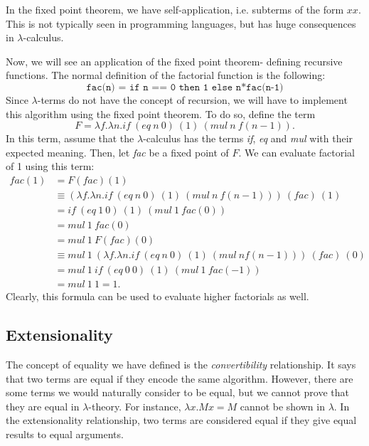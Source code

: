 \documentclass[a4paper, openany]{memoir}
\theoremstyle{definition}
\begin{document}
    In the fixed point theorem, we have self-application, i.e. subterms of the form $xx$. This is not typically seen in programming languages, but has huge consequences in $\lambda$-calculus.

    Now, we will see an application of the fixed point theorem- defining recursive functions. The normal definition of the factorial function is the following:
    \[\texttt{fac(n) = if n == 0 then 1 else n*fac(n-1)}\]
    Since $\lambda$-terms do not have the concept of recursion, we will have to implement this algorithm using the fixed point theorem. To do so, define the term
    \[F = \lambda f.\lambda n.\textit{if} \ (\textit{eq} \ n \ 0) \ (1) \ (\textit{mul} \ n \ f(n-1)).\]
    In this term, assume that the $\lambda$-calculus has the terms \textit{if}, \textit{eq} and \textit{mul} with their expected meaning. Then, let \textit{fac} be a fixed point of $F$. We can evaluate factorial of 1 using this term:
    \begin{align*}
        \textit{fac}(1) &= F(\textit{fac})(1) \\
        &\equiv (\lambda f.\lambda n.\textit{if} \ (\textit{eq} \ n \ 0) \ (1) \ (\textit{mul} \ n \ f(n-1))) \ (\textit{fac}) \ (1) \\
        &= \textit{if} \ (\textit{eq} \ 1 \ 0) \ (1) \ (\textit{mul} \ 1 \ \textit{fac}(0)) \\
        &= \textit{mul} \ 1 \ \textit{fac}(0) \\
        &= \textit{mul} \ 1 \ F(\textit{fac})(0) \\
        &\equiv \textit{mul} \ 1 \ (\lambda f.\lambda n.\textit{if} \ (\textit{eq} \ n \ 0) \ (1) \ (\textit{mul} \ n f(n-1))) \ (\textit{fac}) \ (0) \\
        &= \textit{mul} \ 1 \ \textit{if} \ (\textit{eq} \ 0 \ 0) \ (1) \ (\textit{mul} \ 1 \ \textit{fac}(-1))  \\
        &= \textit{mul} \ 1 \ 1 = 1.
    \end{align*}
    \noindent Clearly, this formula can be used to evaluate higher factorials as well.
    
    \subsection{Extensionality}
    The concept of equality we have defined is the \emph{convertibility} relationship. It says that two terms are equal if they encode the same algorithm. However, there are some terms we would naturally consider to be equal, but we cannot prove that they are equal in $\lambda$-theory. For instance, $\lambda x.Mx = M$ cannot be shown in $\lambda$. In the extensionality relationship, two terms are considered equal if they give equal results to equal arguments.
\end{document}

